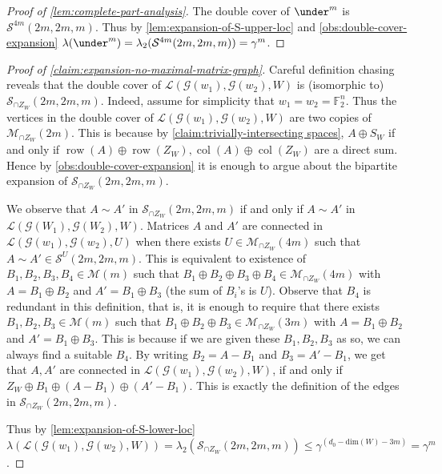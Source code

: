 \documentclass[10pt,a4paper]{article}
\newcommand{\prettyref}[1]{\cref{#1}}
\theoremstyle{definition}
\theoremstyle{remark}
\def\dim{\mathrm{ dim}}
\newcommand{\F}{\mathbb{F}}
\DeclareMathOperator{\row}{row}
\DeclareMathOperator{\col}{col}
\renewcommand{\leq}{\leqslant}
\numberwithin{equation}{section}
\let\pref=\prettyref
\def\Gr{\mathcal{G}}
\def\SL{\mathcal{L}}
\def\MP{\mathcal{M}}
\begin{document}
\begin{proof}[Proof of \pref{lem:complete-part-analysis}]
    The double cover of \(\under^m\) is \(\mathcal{S}^{4m}(2m,2m,m)\). Thus by \pref{lem:expansion-of-S-upper-loc} and \pref{obs:double-cover-expansion} \(\lambda(\under^m) = \lambda_2(\mathcal{S}^{4m}(2m,2m,m)) = \gamma^{ m}\).
\end{proof}

\begin{proof}[Proof of \pref{claim:expansion-no-maximal-matrix-graph}]
    Careful definition chasing reveals that the double cover of \(\SL(\Gr(w_1),\Gr(w_2),W)\) is (isomorphic to) \(\mathcal{S}_{\cap Z_W}(2m,2m,m)\). Indeed, assume for simplicity that \(w_1 = w_2 = \F_2^n\). Thus the vertices in the double cover of \(\SL(\Gr(w_1),\Gr(w_2),W)\) are two copies of \(\MP_{\cap Z_W}(2m)\). This is because by \pref{claim:trivially-intersecting spaces}, \(A \oplus S_W\) if and only if \(\row(A) \oplus \row(Z_W), \col(A) \oplus \col(Z_W)\) are a direct sum. Hence by \pref{obs:double-cover-expansion} it is enough to argue about the bipartite expansion of \(\mathcal{S}_{\cap Z_W}(2m,2m,m)\).
    
    We observe that \(A \sim A'\) in \(\mathcal{S}_{\cap Z_W}(2m,2m,m)\) if and only if \(A \sim A'\) in \(\SL(\Gr(W_1),\Gr(W_2),W)\). Matrices \(A\) and \(A'\) are connected in \(\SL(\Gr(w_1),\Gr(w_2),U)\) when there exists \(U \in \MP_{\cap Z_W}(4m)\) such that \(A \sim A' \in \mathcal{S}^U(2m,2m,m)\). This is equivalent to existence of \(B_1,B_2,B_3,B_4 \in \MP(m)\) such that \(B_1 \oplus B_2 \oplus B_3 \oplus B_4 \in \MP_{\cap Z_W}(4m)\) with \(A = B_1 \oplus B_2\) and \(A' = B_1 \oplus B_3\) (the sum of \(B_i\)'s is \(U\)). Observe that \(B_4\) is redundant in this definition, that is, it is enough to require that there exists \(B_1,B_2,B_3 \in \MP(m)\) such that \(B_1 \oplus B_2 \oplus B_3 \in \MP_{\cap Z_W}(3m)\) with \(A = B_1 \oplus B_2\) and \(A' = B_1 \oplus B_3\). This is because if we are given these \(B_1,B_2,B_3\) as so, we can always find a suitable \(B_4\). By writing \(B_2 = A-B_1\) and \(B_3 = A'-B_1\), we get that \(A,A'\) are connected in \(\SL(\Gr(w_1),\Gr(w_2),W)\), if and only if \(Z_W \oplus B_1 \oplus (A-B_1) \oplus (A'-B_1)\). This is exactly the definition of the edges in \(\mathcal{S}_{\cap Z_W}(2m,2m,m)\).

   Thus by \pref{lem:expansion-of-S-lower-loc} \(\lambda(\SL(\Gr(w_1),\Gr(w_2),W)) = \lambda_2(\mathcal{S}_{\cap Z_W}(2m,2m,m))\leq \gamma^{(d_0-\dim(W)-3m)} = \gamma^{m}\).    
\end{proof}
\end{document}
